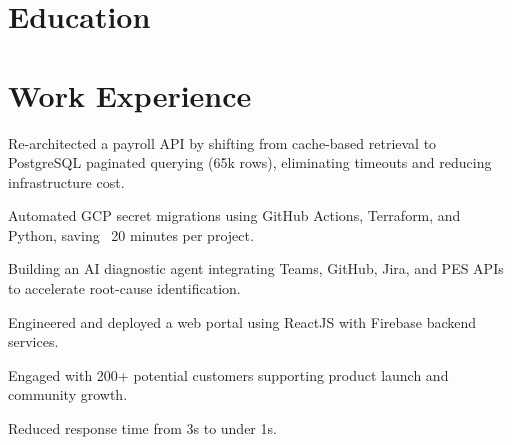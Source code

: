 \documentclass[]{deedy-resume-reversed}
\begin{document}

\section{Education}

\sectionsep

\section{Work Experience}

\begin{tightemize}
\item Re-architected a payroll API by shifting from cache-based retrieval to PostgreSQL paginated querying (65k rows), eliminating timeouts and reducing infrastructure cost.
\item Automated GCP secret migrations using GitHub Actions, Terraform, and Python, saving ~20 minutes per project.
\item Building an AI diagnostic agent integrating Teams, GitHub, Jira, and PES APIs to accelerate root-cause identification.
\end{tightemize}
\sectionsep

\begin{tightemize}
\item Engineered and deployed a web portal using ReactJS with Firebase backend services.
\item Engaged with 200+ potential customers supporting product launch and community growth.
\item Reduced response time from 3s to under 1s.
\end{tightemize}
\sectionsep

\end{document}

